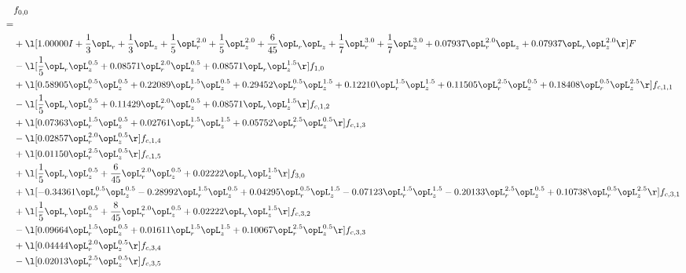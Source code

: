 \begin{alignat}{2} 
\label{eq:f_00_2} 
& f_{0,0} \nonumber \\ 
 = \\ 
& + \l[  1.00000 I + \frac{1}{3} \opL_r + \frac{1}{3} \opL_z + \frac{1}{5} \opL_r^{2.0} + \frac{1}{5} \opL_z^{2.0} + \frac{6}{45} \opL_r \opL_z + \frac{1}{7} \opL_r^{3.0} + \frac{1}{7} \opL_z^{3.0} +  0.07937 \opL_r^{2.0} \opL_z +  0.07937 \opL_r \opL_z^{2.0}  \r] F \nonumber \\ 
& - \l[ \frac{1}{5} \opL_r \opL_z^{0.5} +  0.08571 \opL_r^{2.0} \opL_z^{0.5} +  0.08571 \opL_r \opL_z^{1.5}  \r] f_{1,0} \nonumber \\ 
& + \l[  0.58905 \opL_r^{0.5} \opL_z^{0.5} +  0.22089 \opL_r^{1.5} \opL_z^{0.5} +  0.29452 \opL_r^{0.5} \opL_z^{1.5} +  0.12210 \opL_r^{1.5} \opL_z^{1.5} +  0.11505 \opL_r^{2.5} \opL_z^{0.5} +  0.18408 \opL_r^{0.5} \opL_z^{2.5}  \r] f_{c,1,1} \nonumber \\ 
& - \l[ \frac{1}{5} \opL_r \opL_z^{0.5} +  0.11429 \opL_r^{2.0} \opL_z^{0.5} +  0.08571 \opL_r \opL_z^{1.5}  \r] f_{c,1,2} \nonumber \\ 
& + \l[  0.07363 \opL_r^{1.5} \opL_z^{0.5} +  0.02761 \opL_r^{1.5} \opL_z^{1.5} +  0.05752 \opL_r^{2.5} \opL_z^{0.5}  \r] f_{c,1,3} \nonumber \\ 
& - \l[  0.02857 \opL_r^{2.0} \opL_z^{0.5}  \r] f_{c,1,4} \nonumber \\ 
& + \l[  0.01150 \opL_r^{2.5} \opL_z^{0.5}  \r] f_{c,1,5} \nonumber \\ 
& + \l[ \frac{1}{5} \opL_r \opL_z^{0.5} + \frac{6}{45} \opL_r^{2.0} \opL_z^{0.5} +  0.02222 \opL_r \opL_z^{1.5}  \r] f_{3,0} \nonumber \\ 
& + \l[  -0.34361 \opL_r^{0.5} \opL_z^{0.5}   -0.28992 \opL_r^{1.5} \opL_z^{0.5} +  0.04295 \opL_r^{0.5} \opL_z^{1.5}   -0.07123 \opL_r^{1.5} \opL_z^{1.5}   -0.20133 \opL_r^{2.5} \opL_z^{0.5} +  0.10738 \opL_r^{0.5} \opL_z^{2.5}  \r] f_{c,3,1} \nonumber \\ 
& + \l[ \frac{1}{5} \opL_r \opL_z^{0.5} + \frac{8}{45} \opL_r^{2.0} \opL_z^{0.5} +  0.02222 \opL_r \opL_z^{1.5}  \r] f_{c,3,2} \nonumber \\ 
& - \l[  0.09664 \opL_r^{1.5} \opL_z^{0.5} +  0.01611 \opL_r^{1.5} \opL_z^{1.5} +  0.10067 \opL_r^{2.5} \opL_z^{0.5}  \r] f_{c,3,3} \nonumber \\ 
& + \l[  0.04444 \opL_r^{2.0} \opL_z^{0.5}  \r] f_{c,3,4} \nonumber \\ 
& - \l[  0.02013 \opL_r^{2.5} \opL_z^{0.5}  \r] f_{c,3,5} \nonumber \\ 

\end{alignat}
